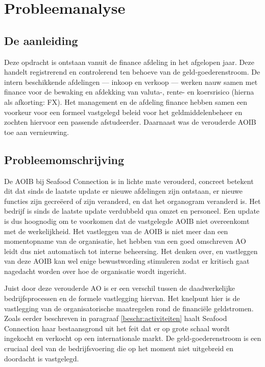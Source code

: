 \chapter{Probleemanalyse}
\label{hoofdstuk:probleemanalyse}
\section{De aanleiding}
Deze opdracht is ontstaan vanuit de finance afdeling in het afgelopen jaar. Deze handelt registrerend en controlerend ten behoeve van de geld-goederenstroom. De intern beschikkende afdelingen –-- inkoop en verkoop --– werken nauw samen met finance voor de bewaking en afdekking van valuta-, rente- en koersrisico (hierna als afkorting: FX). Het management en de afdeling finance hebben samen een voorkeur voor een formeel vastgelegd beleid voor het geldmiddelenbeheer en zochten hiervoor een passende afstudeerder. Daarnaast was de verouderde AOIB toe aan vernieuwing.

\section{Probleemomschrijving}
\label{beschr:problemen}
De AOIB bij Seafood Connection is in lichte mate verouderd, concreet betekent dit dat sinds de laatste update er nieuwe afdelingen zijn ontstaan, er nieuwe functies zijn gecreëerd of zijn veranderd, en dat het organogram veranderd is. Het bedrijf is sinds de laatste update verdubbeld qua omzet en personeel. Een update is dus hoognodig om te voorkomen dat de vastgelegde AOIB niet overeenkomt met de werkelijkheid. 
Het vastleggen van de AOIB is niet meer dan een momentopname van de organisatie, het hebben van een goed omschreven AO leidt dus niet automatisch tot interne beheersing. Het denken over, en vastleggen van deze AOIB kan wel enige bewustwording stimuleren zodat er kritisch gaat nagedacht worden over hoe de organisatie wordt ingericht. \citep{bivpraktijk}

Juist door deze verouderde AO is er een verschil tussen de daadwerkelijke bedrijfsprocessen en de formele vastlegging hiervan. Het knelpunt hier is de vastlegging van de organisatorische maatregelen rond de financiële geldstromen. Zoals eerder beschreven in paragraaf \ref{beschr:activiteiten} haalt Seafood Connection haar bestaansgrond uit het feit dat er op grote schaal wordt ingekocht en verkocht op een internationale markt. De geld-goederenstroom is een cruciaal deel van de bedrijfsvoering die op het moment niet uitgebreid en doordacht is vastgelegd. \citep{aoibsfc}

